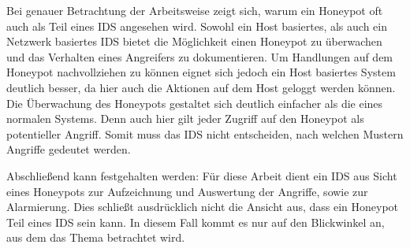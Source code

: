 Bei genauer Betrachtung der Arbeitsweise zeigt sich, warum ein Honeypot oft auch als Teil eines IDS angesehen wird. Sowohl ein Host basiertes, als auch ein Netzwerk basiertes IDS bietet die Möglichkeit einen Honeypot zu überwachen und das Verhalten eines Angreifers zu dokumentieren. Um Handlungen auf dem Honeypot nachvollziehen zu können eignet sich jedoch ein Host basiertes System deutlich besser, da hier auch die Aktionen auf dem Host geloggt werden können. Die Überwachung des Honeypots gestaltet sich deutlich einfacher als die eines normalen Systems. Denn auch hier gilt jeder Zugriff auf den Honeypot als potentieller Angriff. Somit muss das IDS nicht entscheiden, nach welchen Mustern Angriffe gedeutet werden. 

Abschließend kann festgehalten werden: Für diese Arbeit dient ein IDS aus Sicht eines Honeypots zur Aufzeichnung und Auswertung der Angriffe, sowie zur Alarmierung. Dies schließt ausdrücklich nicht die Ansicht aus, dass ein Honeypot Teil eines IDS sein kann. In diesem Fall kommt es nur auf den Blickwinkel an, aus dem das Thema betrachtet wird.